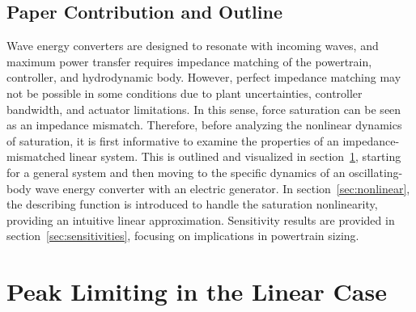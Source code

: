 \documentclass{ifacconf}
\begin{document}
\subsection{Paper Contribution and Outline}
Wave energy converters are designed to resonate with incoming waves, and maximum power transfer requires impedance matching of the powertrain, controller, and hydrodynamic body. However, perfect impedance matching may not be possible in some conditions due to plant uncertainties, controller bandwidth, and actuator limitations. In this sense, force saturation can be seen as an impedance mismatch. Therefore, before analyzing the nonlinear dynamics of saturation, it is first informative to examine the properties of an impedance-mismatched linear system. This is outlined and visualized in section~\ref{sec:linear}, starting for a general system and then moving to the specific dynamics of an oscillating-body wave energy converter with an electric generator. In section~\ref{sec:nonlinear}, the describing function is introduced to handle the saturation nonlinearity, providing an intuitive linear approximation. Sensitivity results are provided in section~\ref{sec:sensitivities}, focusing on implications in powertrain sizing.

\section{Peak Limiting in the Linear Case}\label{sec:linear}
\end{document}
